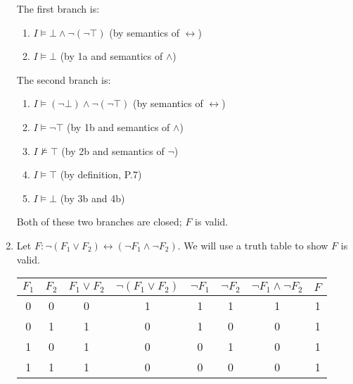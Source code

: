\begin{exer}[1.2]
\begin{enumerate}[label=(\alph*)]
            The first branch is:
            \begin{enumerate}[label=\arabic*a.]
                \item %
                    $I \models \bot \land \neg (\neg \top)$ (by semantics of $\leftrightarrow$)
                \item %
                    $I \models \bot$ (by 1a and semantics of $\land$)
            \end{enumerate}

            The second branch is:
            \begin{enumerate}[label=\arabic*b.]
                \item %
                    $I \models (\neg \bot) \land \neg (\neg \top)$ (by semantics of $\leftrightarrow$)
                \item %
                    $I \models \neg\top$ (by 1b and semantics of $\land$)
                \item %
                    $I \not\models \top$ (by 2b and semantics of $\neg$)
                \item %
                    $I \models \top$ (by definition, P.7)
                \item %
                    $I \models \bot$ (by 3b and 4b)
            \end{enumerate}
            Both of these two branches are closed; $F$ is valid.
            \addtocounter{enumi}{14} %
        \item %
            Let $F: \neg(F_1 \lor F_2) \leftrightarrow (\neg F_1 \land \neg F_2)$.
            We will use a truth table to show $F$ is valid.
            \begin{center}
                \begin{tabular}{ |c|c||c|c|c|c|c|c| }
                    \hline
                        $F_1$ & $F_2$ & $F_1 \lor F_2$ & $\neg(F_1 \lor F_2)$ & $\neg F_1$ & $\neg F_2$ & $\neg F_1 \land \neg F_2$ & $F$ \\ \hline
                        0 & 0 & 0 & 1 & 1 & 1 & 1 & 1 \\ \hline
                        0 & 1 & 1 & 0 & 1 & 0 & 0 & 1 \\ \hline
                        1 & 0 & 1 & 0 & 0 & 1 & 0 & 1 \\ \hline
                        1 & 1 & 1 & 0 & 0 & 0 & 0 & 1 \\ \hline
                \end{tabular}
            \end{center}

\end{enumerate}
\end{exer}
